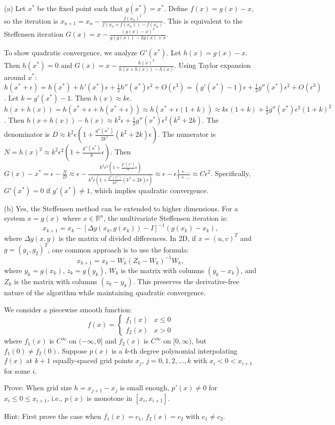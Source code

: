 \begin{solution}
(a) Let $x^*$ be the fixed point such that $g(x^*) = x^*$. Define $f(x) = g(x) - x$, so the iteration is $x_{n+1} = x_n - \frac{f(x_n)^2}{f(x_n + f(x_n)) - f(x_n)}$. This is equivalent to the Steffensen iteration $G(x) = x - \frac{(g(x)-x)^2}{g(g(x)) - 2g(x) + x}$.

To show quadratic convergence, we analyze $G'(x^*)$. Let $h(x) = g(x) - x$. Then $h(x^*) = 0$ and $G(x) = x - \frac{h(x)^2}{h(x+h(x)) - h(x)}$. 
Using Taylor expansion around $x^*$:
$h(x^* + \epsilon) = h(x^*) + h'(x^*)\epsilon + \frac{1}{2}h''(x^*)\epsilon^2 + O(\epsilon^3) = (g'(x^*)-1)\epsilon + \frac{1}{2}g''(x^*)\epsilon^2 + O(\epsilon^3)$.
Let $k = g'(x^*) - 1$. Then $h(x) \approx k\epsilon$.
$h(x+h(x)) = h(x^* + \epsilon + h(x^*+\epsilon)) \approx h(x^* + \epsilon(1+k)) \approx k\epsilon(1+k) + \frac{1}{2}g''(x^*) \epsilon^2 (1+k)^2$.
Then $h(x+h(x)) - h(x) \approx k^2\epsilon + \frac{1}{2}g''(x^*)\epsilon^2(k^2+2k)$.
The denominator is $D \approx k^2\epsilon(1 + \frac{g''(x^*)}{2k^2}(k^2+2k)\epsilon)$.
The numerator is $N = h(x)^2 \approx k^2\epsilon^2(1 + \frac{g''(x^*)}{k}\epsilon)$.
Then $G(x) - x^* = \epsilon - \frac{N}{D} \approx \epsilon - \frac{k^2\epsilon^2(1 + \frac{g''(x^*)}{k}\epsilon)}{k^2\epsilon(1 + \frac{g''(x^*)}{2k^2}(k^2+2k)\epsilon)} \approx \epsilon - \epsilon \frac{1 + \dots}{1 + \dots} \approx C\epsilon^2$.
Specifically, $G'(x^*) = 0$ if $g'(x^*) \neq 1$, which implies quadratic convergence.

(b) Yes, the Steffensen method can be extended to higher dimensions. For a system $x = g(x)$ where $x \in \mathbb{R}^n$, the multivariate Steffensen iteration is:
\[
x_{k+1} = x_k - [ \Delta g(x_k, g(x_k)) - I ]^{-1} (g(x_k) - x_k),
\]
where $\Delta g(x, y)$ is the matrix of divided differences. In 2D, if $x = (u, v)^T$ and $g = (g_1, g_2)^T$, one common approach is to use the formula:
\[
x_{k+1} = x_k - W_k (Z_k - W_k)^{-1} W_k,
\]
where $y_k = g(x_k)$, $z_k = g(y_k)$, $W_k$ is the matrix with columns $(y_k - x_k)$, and $Z_k$ is the matrix with columns $(z_k - y_k)$. This preserves the derivative-free nature of the algorithm while maintaining quadratic convergence.
\end{solution}

\begin{exercise}
\label{applied:2017:3}
We consider a piecewise smooth function:
\[
f(x)=\begin{cases}f_{1}(x)&x\leq 0\\ f_{2}(x)&x>0\end{cases}
\]
where $f_{1}(x)$ is $C^{\infty}$ on $(-\infty,0]$ and $f_{2}(x)$ is $C^{\infty}$ on $[0,\infty)$, but $f_{1}(0)\neq f_{2}(0)$. Suppose $p(x)$ is a $k$-th degree polynomial interpolating $f(x)$ at $k+1$ equally-spaced grid points $x_{j}$, $j=0,1,2,\dots,k$ with $x_{i}<0<x_{i+1}$ for some $i$.

Prove: When grid size $h=x_{j+1}-x_{j}$ is small enough, $p'(x)\neq 0$ for $x_{i}\leq 0\leq x_{i+1}$, i.e., $p(x)$ is monotone in $[x_{i},x_{i+1}]$.

Hint: First prove the case when $f_{1}(x)=c_{1}$, $f_{2}(x)=c_{2}$ with $c_{1}\neq c_{2}$.
\end{exercise}

